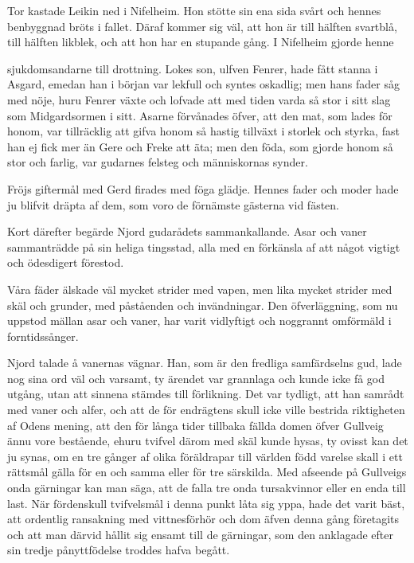 Tor kastade Leikin ned i Nifelheim. Hon stötte sin ena sida svårt och
hennes benbyggnad bröts i fallet. Däraf kommer sig väl, att hon är till
hälften svartblå, till hälften likblek, och att hon har en stupande
gång. I Nifelheim gjorde henne

sjukdomsandarne till drottning. Lokes son, ulfven Fenrer, hade fått
stanna i Asgard, emedan han i början var lekfull och syntes oskadlig;
men hans fader såg med nöje, huru Fenrer växte och lofvade att med tiden
varda så stor i sitt slag som Midgardsormen i sitt. Asarne förvånades
öfver, att den mat, som lades för honom, var tillräcklig att gifva honom
så hastig tillväxt i storlek och styrka, fast han ej fick mer än Gere
och Freke att äta; men den föda, som gjorde honom så stor och farlig,
var gudarnes felsteg och människornas synder.

Fröjs giftermål med Gerd firades med föga glädje. Hennes fader och moder
hade ju blifvit dräpta af dem, som voro de förnämste gästerna vid
fästen.

Kort därefter begärde Njord gudarådets sammankallande. Asar och vaner
sammanträdde på sin heliga tingsstad, alla med en förkänsla af att något
vigtigt och ödesdigert förestod.

Våra fäder älskade väl mycket strider med vapen, men lika mycket strider
med skäl och grunder, med påståenden och invändningar. Den
öfverläggning, som nu uppstod mällan asar och vaner, har varit
vidlyftigt och noggrannt omförmäld i forntidssånger.

Njord talade å vanernas vägnar. Han, som är den fredliga samfärdselns
gud, lade nog sina ord väl och varsamt, ty ärendet var grannlaga och
kunde icke få god utgång, utan att sinnena stämdes till förlikning. Det
var tydligt, att han samrådt med vaner och alfer, och att de för
endrägtens skull icke ville bestrida riktigheten af Odens mening, att
den för långa tider tillbaka fällda domen öfver Gullveig ännu vore
bestående, ehuru tvifvel därom med skäl kunde hysas, ty ovisst kan det
ju synas, om en tre gånger af olika föräldrapar till världen född
varelse skall i ett rättsmål gälla för en och samma eller för tre
särskilda. Med afseende på Gullveigs onda gärningar kan man säga, att de
falla tre onda tursakvinnor eller en enda till last. När fördenskull
tvifvelsmål i denna punkt låta sig yppa, hade det varit bäst, att
ordentlig ransakning med vittnesförhör och dom äfven denna gång
företagits
och att man därvid hållit sig ensamt till de gärningar, som den
anklagade efter sin tredje pånyttfödelse troddes hafva begått.

